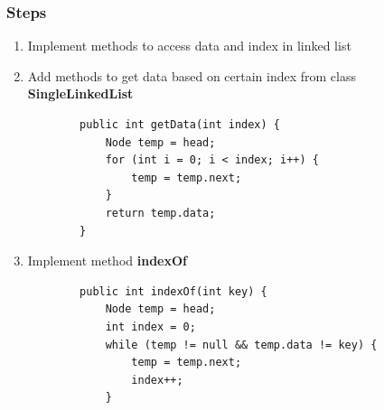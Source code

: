\documentclass[12pt,titlepage]{article}
\begin{document}
\subsubsection{Steps}
\begin{enumerate}
    \item Implement methods to access data and index in linked list
    \item Add methods to get data based on certain index from class \textbf{SingleLinkedList}
    \begin{verbatim}
        public int getData(int index) {
            Node temp = head;
            for (int i = 0; i < index; i++) {
                temp = temp.next;
            }
            return temp.data;
        }
    \end{verbatim}
    \item Implement method \textbf{indexOf}
    \begin{verbatim}
        public int indexOf(int key) {
            Node temp = head;
            int index = 0;
            while (temp != null && temp.data != key) {
                temp = temp.next;
                index++;
            }


\end{verbatim}
\end{enumerate}
\end{document}
